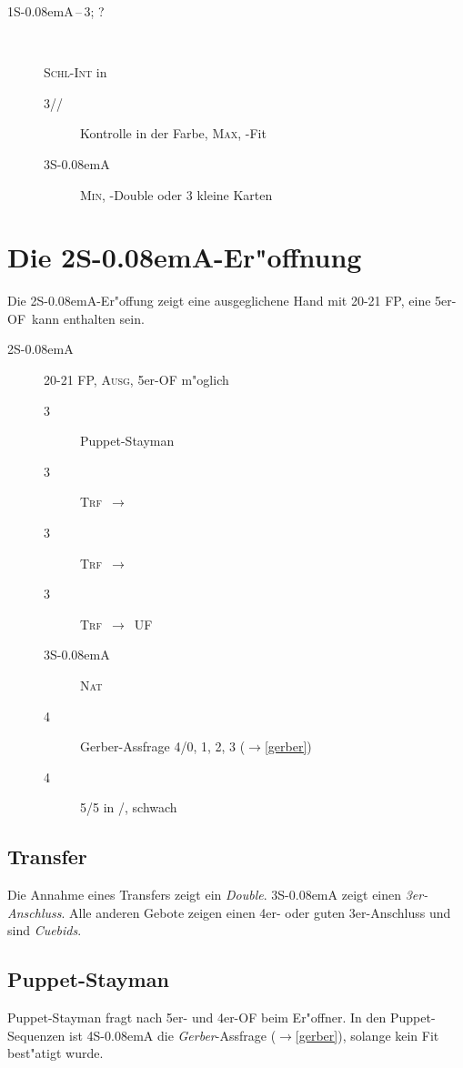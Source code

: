 \documentclass[11pt,german,twocolumn]{scrartcl}
\def\pik{\nobreak\hspace{\cardskip}\Sp\xspace}
\def\coe{\nobreak\hspace{\cardskip}\He\xspace}
\def\kar{\nobreak\hspace{\cardskip}\Di\xspace}
\def\tre{\nobreak\hspace{\cardskip}\Cl\xspace}
\def\pi{\Sp\xspace}
\def\co{\He\xspace}
\def\tr{\Cl\xspace}
\def\ra{$\rightarrow$\xspace}
\def\ufa{\nobreak\textsf{UF}\xspace}
\def\ofa{\nobreak\textsf{OF}\xspace}
\def\sa{\nobreak\textsf{S\kern-0.08emA}\xspace}
\def\SA{\nobreak\hspace{\cardskip}\sa}
\def\sep{\,--\,}
\newcommand{\conv}[1]{\emph{#1}}
\def\bal{\textsc{Ausg}\xspace}
\def\nat{\textsc{Nat}\xspace}
\def\maxi{\textsc{Max}\xspace}
\def\mini{\textsc{Min}\xspace}
\def\bdsc{\begin{description}}
\def\edsc{\end{description}}
\def\xfer{\textsc{Trf}\xspace}
\def\xferto{\xfer~\ra~}
\def\slamint{\textsc{Schl-Int}\xspace}
\newcommand{\Index}[1]{#1\index{#1}}
\begin{document}
\bdsc
  \item[1\SA{}\sep3\tre; ?]~

  \slamint in \tr
  \bdsc
    \item[3\kar/\co/\pi] Kontrolle in der Farbe, \maxi, \tr-Fit
    \item[3\SA] \mini, \tr-Double oder 3 kleine Karten
  \edsc
\edsc

\newpage
\section{Die 2\SA-Er"offnung}

Die 2\SA-Er"offung zeigt eine ausgeglichene Hand mit 20-21 FP, eine 5er-\ofa\
kann enthalten sein.

\bdsc
\item[2\SA] 20-21 FP, \bal, 5er-\ofa m"oglich
  \bdsc
  \item[3\tre] Puppet-Stayman
  \item[3\kar] \xferto \co
  \item[3\coe] \xferto \pi
  \item[3\pik] \xferto \ufa
  \item[3\SA] \nat
  \item[4\tre] \Index{Gerber}-Assfrage 4/0, 1, 2, 3 (\ra \ref{gerber})
  \item[4\kar] 5/5 in \pi/\co, schwach
  \edsc
\edsc

\subsection{Transfer}

Die Annahme eines Transfers zeigt ein \emph{Double}. 3\SA zeigt einen
\emph{3er-Anschluss}. Alle anderen Gebote zeigen einen 4er- oder guten
3er-Anschluss und sind \emph{Cuebids}.

\subsection{Puppet-Stayman}

Puppet-Stayman fragt nach 5er- und 4er-\ofa beim Er"offner. In den
Puppet-Sequenzen ist 4\SA die \conv{Gerber}-Assfrage (\ra \ref{gerber}),
solange kein Fit best"atigt wurde.
\end{document}
